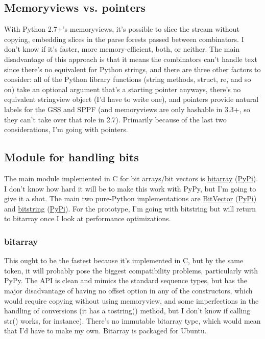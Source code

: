 \documentclass[12pt]{article}
\begin{document}
\subsection{Memoryviews vs. pointers}
\label{sec:memoryviews_pointers}

With Python 2.7+'s memoryviews, it's possible to slice the stream
without copying, embedding slices in the parse forests passed between
combinators.  I don't know if it's faster, more memory-efficient,
both, or neither.  The main disadvantage of this approach is that it
means the combinators can't handle text since there's no equivalent
for Python strings, and there are three other factors to consider: all
of the Python library functions (string methods, struct, re, and so
on) take an optional argument that's a starting pointer anyways,
there's no equivalent stringview object (I'd have to write one), and
pointers provide natural labels for the GSS and SPPF (and memoryviews
are only hashable in 3.3+, so they can't take over that role in 2.7).
Primarily because of the last two considerations, I'm going with
pointers.


\subsection{Module for handling bits}
\label{sec:bits_module}

The main module implemented in C for bit arrays/bit vectors is
\href{https://github.com/ilanschnell/bitarray}{bitarray}
(\href{https://pypi.python.org/pypi/bitarray/}{PyPi}).  I don't know
how hard it will be to make this work with PyPy, but I'm going to give
it a shot.  The main two pure-Python implementations are
\href{https://engineering.purdue.edu/kak/dist/BitVector-3.3.2.html}{BitVector}
(\href{https://pypi.python.org/pypi/BitVector/3.3.2}{PyPi}) and
\href{https://code.google.com/p/python-bitstring/}{bitstring}
(\href{https://pypi.python.org/pypi/bitstring/3.1.3}{PyPi}).  For the
prototype, I'm going with bitstring but will return to bitarray once I
look at performance optimizations.

\subsubsection{bitarray}
\label{sec:bitarray}

This ought to be the fastest because it's implemented in C, but by the
same token, it will probably pose the biggest compatibility problems,
particularly with PyPy.  The API is clean and mimics the standard
sequence types, but has the major disadvantage of having no offset
option in any of the constructors, which would require copying without
using memoryview, and some imperfections in the handling of
conversions (it has a tostring() method, but I don't know if calling
str() works, for instance).  There's no immutable bitarray type, which
would mean that I'd have to make my own.  Bitarray is packaged for
Ubuntu.
\end{document}
